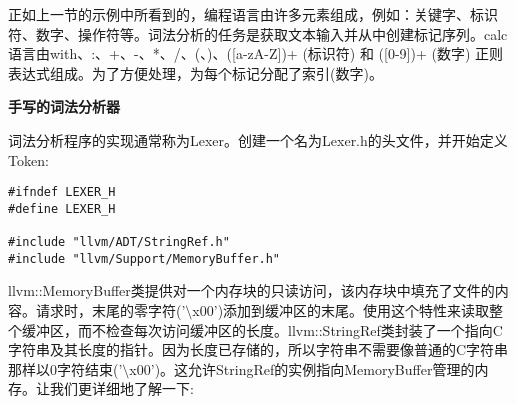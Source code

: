 正如上一节的示例中所看到的，编程语言由许多元素组成，例如：关键字、标识符、数字、操作符等。词法分析的任务是获取文本输入并从中创建标记序列。calc语言由with、:、+、-、*、/、(、)、([a-zA-Z])+ (标识符) 和 ([0-9])+ (数字) 正则表达式组成。为了方便处理，为每个标记分配了索引(数字)。\par

\hspace*{\fill} \par %
\textbf{手写的词法分析器}

词法分析程序的实现通常称为Lexer。创建一个名为Lexer.h的头文件，并开始定义Token:\par

\begin{lstlisting}[caption={}]
#ifndef LEXER_H
#define LEXER_H

#include "llvm/ADT/StringRef.h"
#include "llvm/Support/MemoryBuffer.h"
\end{lstlisting}

llvm::MemoryBuffer类提供对一个内存块的只读访问，该内存块中填充了文件的内容。请求时，末尾的零字符('$\setminus$x00')添加到缓冲区的末尾。使用这个特性来读取整个缓冲区，而不检查每次访问缓冲区的长度。llvm::StringRef类封装了一个指向C字符串及其长度的指针。因为长度已存储的，所以字符串不需要像普通的C字符串那样以0字符结束('$\setminus$x00')。这允许StringRef的实例指向MemoryBuffer管理的内存。让我们更详细地了解一下:\par

